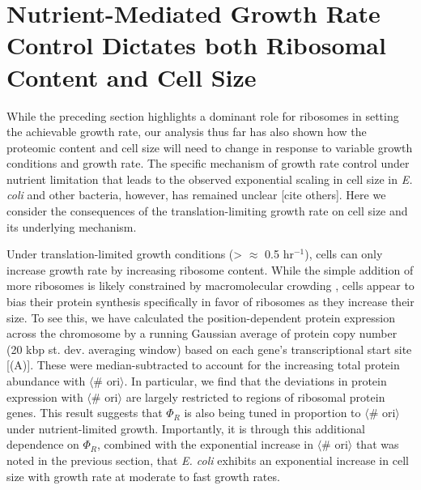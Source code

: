 \section{Nutrient-Mediated Growth Rate Control Dictates both Ribosomal Content and Cell Size}
\label{sec:minimal_model}
While the preceding section highlights a dominant role for ribosomes in setting
the achievable growth rate, our analysis thus far has also shown how the
proteomic content and cell size will need to change in response to variable
growth conditions and growth rate. The specific mechanism of growth rate control
under nutrient limitation that leads to the observed exponential scaling in cell
size in \textit{E. coli} and other bacteria, however, has remained unclear
\citep{si2017}  [cite others]. Here we consider the consequences of the
translation-limiting growth rate on cell size and its underlying mechanism.

Under translation-limited growth conditions (> $\approx$ 0.5 hr$^{-1}$), cells can
only increase growth rate by increasing ribosome content. While the simple
addition of more ribosomes is likely constrained by macromolecular crowding
\citep{delarue2018, solerbistue2020}, cells appear to bias their protein
synthesis specifically in favor of ribosomes as they increase their size. To see
this, we have calculated the position-dependent protein expression across the
chromosome by a running Gaussian average of protein copy number (20 kbp st. dev.
averaging window) based on each gene's transcriptional start site
[(A)]. These were median-subtracted to account  for
the increasing total protein abundance with $\langle$\# ori$\rangle$. In
particular, we find that the deviations in protein expression with $\langle$\#
ori$\rangle$ are largely restricted to regions of ribosomal protein genes. This
result suggests that $\Phi_R$ is also being tuned in proportion to $\langle$\#
ori$\rangle$ under nutrient-limited growth. Importantly, it is through this
additional dependence on $\Phi_R$, combined with the exponential increase in
$\langle$\# ori$\rangle$ that was noted in the previous section, that \textit{E.
coli} exhibits an exponential increase in cell size with growth rate at moderate to
fast growth rates.

